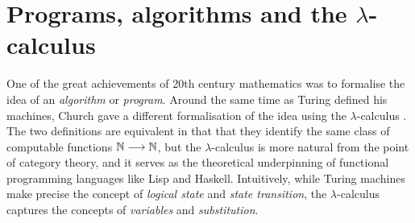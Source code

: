 \documentclass[english,letter paper,12pt,reqno]{article}
\theoremstyle{example}
\begin{document}



\section{Programs, algorithms and the $\lambda$-calculus}\label{section:lambda_calc}

One of the great achievements of 20th century mathematics was to formalise the idea of an \emph{algorithm} or \emph{program}. Around the same time as Turing defined his machines, Church gave a different formalisation of the idea using the $\lambda$-calculus \cite{church,selinger}. The two definitions are equivalent in that that they identify the same class of computable functions $\mathbb{N} \longrightarrow \mathbb{N}$, but the $\lambda$-calculus is more natural from the point of category theory, and it serves as the theoretical underpinning of functional programming languages like Lisp \cite{mccarthy} and Haskell. Intuitively, while Turing machines make precise the concept of \emph{logical state} and \emph{state transition}, the $\lambda$-calculus captures the concepts of \emph{variables} and \emph{substitution}. 
\end{document}
